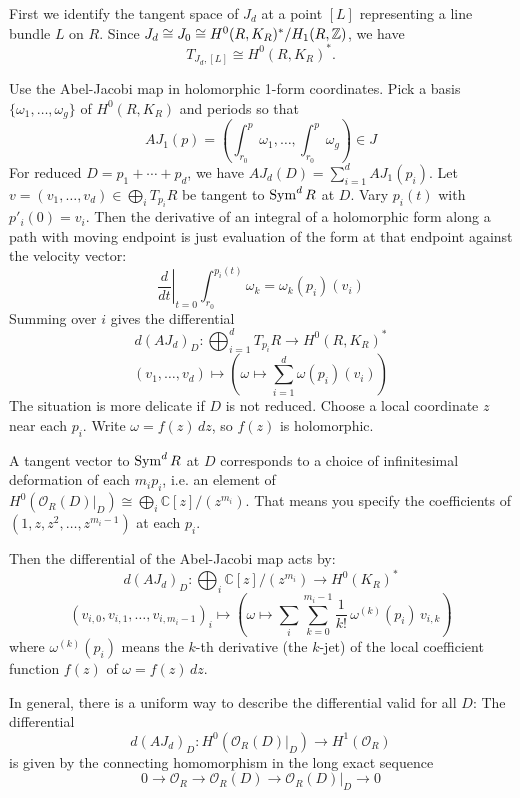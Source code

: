\documentclass[12pt]{article}
\begin{document}
\begin{remark}
     First we identify the tangent space of $J_d$ at a point $[L]$ representing a line bundle $L$ on $R$. Since $J_d \cong J_0 \cong H^0(R,K_R)^*/H_1(R,\mathbb{Z})$, we have
    \[T_{J_d,[L]} \cong H^0(R,K_R)^*.
    \]

    Use the Abel-Jacobi map in holomorphic 1-form coordinates. Pick a basis $\{\omega_1,\dots,\omega_g\}$ of $H^0(R,K_R)$ and periods so that
    \[
        AJ_1(p)=\left(\int_{r_0}^p \omega_1,\dots,\int_{r_0}^p \omega_g\right)\in J
    \]
    For reduced $D=p_1+\cdots+p_d$, we have $AJ_d(D)=\sum_{i=1}^d AJ_1(p_i)$. Let $v=(v_1,\dots,v_d)\in \bigoplus_i T_{p_i}R$ be tangent to $\operatorname{Sym}^dR$ at $D$. Vary $p_i(t)$ with $ p'_i(0)=v_i$. Then the derivative of an integral of a holomorphic form along a path with moving endpoint is just evaluation of the form at that endpoint against the velocity vector:
    \[
        \left.\frac{d}{dt}\right|_{t=0}\int_{r_0}^{p_i(t)}\omega_k=\omega_k(p_i)(v_i)
    \]
    Summing over $i$ gives the differential
    \[
        d(AJ_d)_D: \bigoplus_{i=1}^d T_{p_i}R \longrightarrow H^0(R,K_R)^*
    \]
    \[
        (v_1,\dots,v_d) \longmapsto \left(\omega \mapsto \sum_{i=1}^d \omega(p_i)(v_i)\right)
    \]
    The situation is more delicate if $D$ is not reduced. Choose a local coordinate $z$ near each $p_i$. Write $\omega = f(z)\,dz$, so $f(z)$ is holomorphic.

    A tangent vector to $\operatorname{Sym}^d R$ at $D$ corresponds to a choice of infinitesimal deformation of each $m_i p_i$, i.e. an element of $H^0(\mathcal O_R(D)|_D) \cong \bigoplus_i \mathbb C[z]/(z^{m_i})$. That means you specify the coefficients of $(1, z, z^2, \ldots, z^{m_i-1})$ at each $p_i$.

    Then the differential of the Abel-Jacobi map acts by:
    \[
        d(AJ_d)_D: \bigoplus_i \mathbb C[z]/(z^{m_i}) \longrightarrow H^0(K_R)^*
    \]
    \[
        (v_{i,0}, v_{i,1}, \ldots, v_{i,m_i-1})_i \mapsto \left(\omega \mapsto \sum_i \sum_{k=0}^{m_i-1} \frac{1}{k!}\, \omega^{(k)}(p_i)\, v_{i,k}\right)
    \]
    where $\omega^{(k)}(p_i)$ means the $k$-th derivative (the $k$-jet) of the local coefficient function $f(z)$ of $\omega=f(z)\,dz$.

    In general, there is a uniform way to describe the differential valid for all $D$:
    The differential \[d(AJ_d)_D : H^0(\mathcal O_R(D)|_D) \to H^1(\mathcal O_R)\] is given by the connecting homomorphism in the long exact sequence \[0 \to \mathcal O_R \to \mathcal O_R(D) \to \mathcal O_R(D)|_D \to 0\]
\end{remark}
\end{document}
